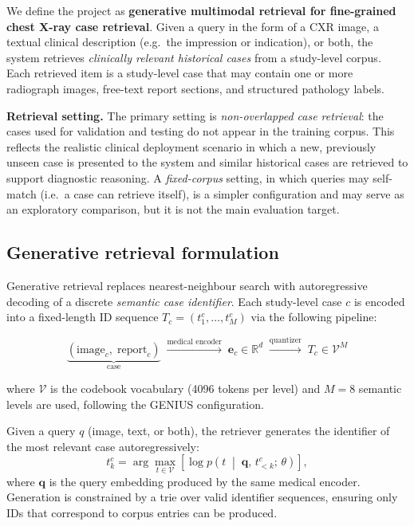 \documentclass[11pt,a4paper]{article}
\begin{document}
We define the project as \textbf{generative multimodal retrieval for
fine-grained chest X-ray case retrieval}.
Given a query in the form of a CXR image, a textual clinical description
(e.g.\ the impression or indication), or both, the system retrieves
\emph{clinically relevant historical cases} from a study-level corpus.
Each retrieved item is a study-level case that may contain one or more
radiograph images, free-text report sections, and structured pathology labels.

\textbf{Retrieval setting.}
The primary setting is \emph{non-overlapped case retrieval}: the cases used for
validation and testing do not appear in the training corpus.
This reflects the realistic clinical deployment scenario in which a new,
previously unseen case is presented to the system and similar historical cases
are retrieved to support diagnostic reasoning.
A \emph{fixed-corpus} setting, in which queries may self-match (i.e.\ a case
can retrieve itself), is a simpler configuration and may serve as an
exploratory comparison, but it is not the main evaluation target.

\subsection{Generative retrieval formulation}

Generative retrieval replaces nearest-neighbour search with autoregressive
decoding of a discrete \emph{semantic case identifier}.
Each study-level case $c$ is encoded into a fixed-length ID sequence
$T_c = (t^c_1, \ldots, t^c_M)$ via the following pipeline:

\[
\underbrace{(\text{image}_c,\; \text{report}_c)}_{\text{case}}
\;\xrightarrow{\text{medical encoder}}\;
\mathbf{e}_c \in \mathbb{R}^d
\;\xrightarrow{\text{quantizer}}\;
T_c \in \mathcal{V}^M
\]

where $\mathcal{V}$ is the codebook vocabulary (4096 tokens per level) and
$M = 8$ semantic levels are used, following the GENIUS configuration.

Given a query $q$ (image, text, or both), the retriever generates the
identifier of the most relevant case autoregressively:
\[
t^c_k = \arg\max_{t \in \mathcal{V}} \left[
    \log p\!\left(t \;\middle|\; \mathbf{q},\, t^c_{<k};\, \theta\right)
\right],
\]
where $\mathbf{q}$ is the query embedding produced by the same medical encoder.
Generation is constrained by a trie over valid identifier sequences, ensuring
only IDs that correspond to corpus entries can be produced.
\end{document}
